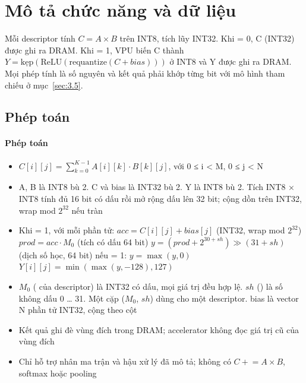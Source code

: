 \section{Mô tả chức năng và dữ liệu}\label{sec:3}

Mỗi descriptor tính $C = A \times B$ trên INT8, tích lũy INT32. Khi  = 0, C (INT32) được
ghi ra DRAM. Khi  = 1, VPU biến C thành
$Y = \text{kẹp}(\text{ReLU}(\text{requantize}(C + bias)))$ ở INT8 và Y được ghi ra DRAM. Mọi phép
tính là số nguyên và kết quả phải khớp từng bit với mô hình tham chiếu ở mục~\ref{sec:3.5}.

\subsection{Phép toán}\label{sec:3.1}

\paragraph{Phép toán}\label{par:3-1}
\begin{itemize}
\item $C[i][j] = \sum_{k=0}^{K-1} A[i][k]\cdot B[k][j]$, với 0 ≤ i < M, 0 ≤ j < N
\item A, B là INT8 bù 2. C và bias là INT32 bù 2. Y là INT8 bù 2. Tích INT8 × INT8 tính đủ 16 bit có dấu rồi mở rộng dấu lên 32 bit; cộng dồn trên INT32, wrap mod $2^{32}$ nếu tràn
\item Khi  = 1, với mỗi phần tử: \newline
\hspace*{1em}$acc = C[i][j] + bias[j]$ \hfill (INT32, wrap mod $2^{32}$) \newline
\hspace*{1em}$prod = acc \cdot M_0$ \hfill (tích có dấu 64 bit) \newline
\hspace*{1em}$y = (prod + 2^{30+sh}) \gg (31+sh)$ \hfill (dịch số học, 64 bit) \newline
\hspace*{1em}nếu  = 1: $y = \max(y, 0)$ \newline
\hspace*{1em}$Y[i][j] = \min(\max(y, -128), 127)$
\item $M_0$ ( của descriptor) là INT32 có dấu, mọi giá trị đều hợp lệ. $sh$ () là số không dấu 0 … 31. Một cặp ($M_0$, $sh$) dùng cho một descriptor. bias là vector N phần tử INT32, cộng theo cột
\item Kết quả ghi đè vùng đích trong DRAM; accelerator không đọc giá trị cũ của vùng đích
\item Chỉ hỗ trợ nhân ma trận và hậu xử lý đã mô tả; không có $C \mathrel{+}= A \times B$, softmax hoặc pooling
\end{itemize}


